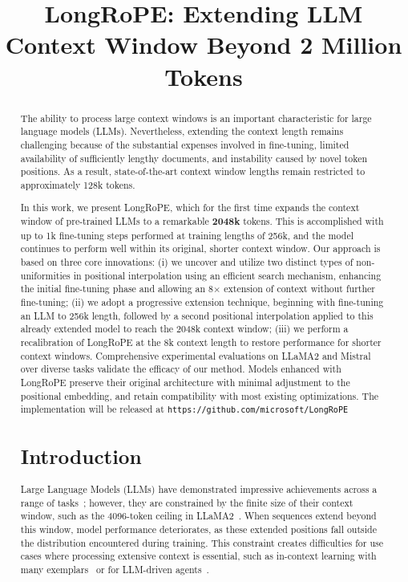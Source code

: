 \title{LongRoPE: Extending LLM Context Window Beyond 2 Million Tokens}

\begin{abstract}
The ability to process large context windows is an important characteristic for large language models (LLMs). Nevertheless, extending the context length remains challenging because of the substantial expenses involved in fine-tuning, limited availability of sufficiently lengthy documents, and instability caused by novel token positions. As a result, state-of-the-art context window lengths remain restricted to approximately 128k tokens.

In this work, we present LongRoPE, which for the first time expands the context window of pre-trained LLMs to a remarkable \textbf{2048k} tokens. This is accomplished with up to 1k fine-tuning steps performed at training lengths of 256k, and the model continues to perform well within its original, shorter context window. Our approach is based on three core innovations: (i) we uncover and utilize two distinct types of non-uniformities in positional interpolation using an efficient search mechanism, enhancing the initial fine-tuning phase and allowing an 8$\times$ extension of context without further fine-tuning; (ii) we adopt a progressive extension technique, beginning with fine-tuning an LLM to 256k length, followed by a second positional interpolation applied to this already extended model to reach the 2048k context window; (iii) we perform a recalibration of LongRoPE at the 8k context length to restore performance for shorter context windows. Comprehensive experimental evaluations on LLaMA2 and Mistral over diverse tasks validate the efficacy of our method. Models enhanced with LongRoPE preserve their original architecture with minimal adjustment to the positional embedding, and retain compatibility with most existing optimizations. The implementation will be released at \texttt{https://github.com/microsoft/LongRoPE}

\section{Introduction}

Large Language Models (LLMs) have demonstrated impressive achievements across a range of tasks~\cite{gpt4,llama2}; however, they are constrained by the finite size of their context window, such as the 4096-token ceiling in LLaMA2~\cite{llama2}. When sequences extend beyond this window, model performance deteriorates, as these extended positions fall outside the distribution encountered during training. This constraint creates difficulties for use cases where processing extensive context is essential, such as in-context learning with many exemplars~\cite{Huang2023FewerIM} or for LLM-driven agents~\cite{park2023generative,madaan2023selfrefine}.


\end{abstract}
